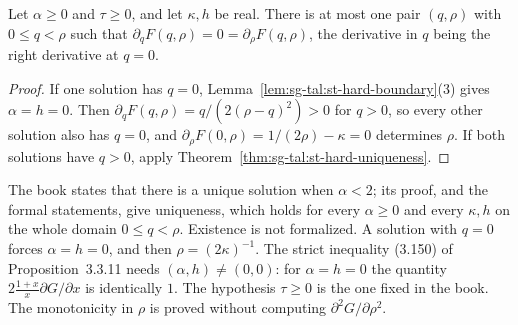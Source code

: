 \begin{theorem}\label{thm:sg-tal:st-hard-uniqueness-boundary}
  \leanok
Let $\alpha\ge0$ and $\tau\ge0$, and let $\kappa,h$ be real. There is at most one pair $(q,\rho)$ with $0\le q<\rho$ such that
$\partial_qF(q,\rho)=0=\partial_\rho F(q,\rho)$, the derivative in $q$ being the right derivative at $q=0$.
\end{theorem}
\begin{proof}
  \leanok
If one solution has $q=0$, Lemma~\ref{lem:sg-tal:st-hard-boundary}(3) gives $\alpha=h=0$. Then
$\partial_qF(q,\rho)=q/(2(\rho-q)^2)>0$ for $q>0$, so every other solution also has $q=0$, and
$\partial_\rho F(0,\rho)=1/(2\rho)-\kappa=0$ determines $\rho$. If both solutions have $q>0$, apply
Theorem~\ref{thm:sg-tal:st-hard-uniqueness}.
\end{proof}

\begin{remark}\label{rem:sg-tal:st-section33-uniqueness}
The book states that there is a unique solution when $\alpha<2$; its proof, and the formal statements, give
uniqueness, which holds for every $\alpha\ge0$ and every $\kappa,h$ on the whole domain $0\le q<\rho$. Existence is not
formalized. A solution with $q=0$ forces $\alpha=h=0$, and then $\rho=(2\kappa)^{-1}$.
The strict inequality (3.150) of Proposition~3.3.11 needs $(\alpha,h)\ne(0,0)$: for $\alpha=h=0$ the quantity
$2\frac{1+x}{x}\partial G/\partial x$ is identically $1$. The hypothesis $\tau\ge0$ is the one fixed in the book. The monotonicity in $\rho$ is proved without computing
$\partial^2G/\partial\rho^2$.
\end{remark}

